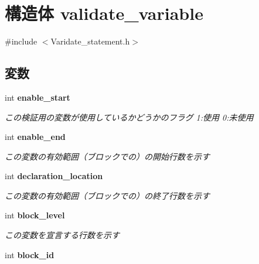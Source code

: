 \section{構造体 validate\_\-variable}
\label{structvalidate__variable}


{\ttfamily \#include $<$Varidate\_\-statement.h$>$}

\subsection*{変数}
\begin{DoxyCompactItemize}
\item 
int {\bf enable\_\-start}\label{structvalidate__variable_a5c45828cb643023cfd27baff775c0acf}

\begin{DoxyCompactList}\small\item\em この検証用の変数が使用しているかどうかのフラグ 1:使用 0:未使用 \item\end{DoxyCompactList}\item 
int {\bf enable\_\-end}\label{structvalidate__variable_a95b3e1941730e028e9c2878f93656dc3}

\begin{DoxyCompactList}\small\item\em この変数の有効範囲（ブロックでの）の開始行数を示す \item\end{DoxyCompactList}\item 
int {\bf declaration\_\-location}\label{structvalidate__variable_aa13526c1c33b126cf8a5da5c96cdfeef}

\begin{DoxyCompactList}\small\item\em この変数の有効範囲（ブロックでの）の終了行数を示す \item\end{DoxyCompactList}\item 
int {\bf block\_\-level}\label{structvalidate__variable_a92692a6ba8c228191546f6d99082f829}

\begin{DoxyCompactList}\small\item\em この変数を宣言する行数を示す \item\end{DoxyCompactList}\item 
int {\bf block\_\-id}\label{structvalidate__variable_a8f7988fadcaa504338c997c60b1b3674}


\end{DoxyCompactItemize}

